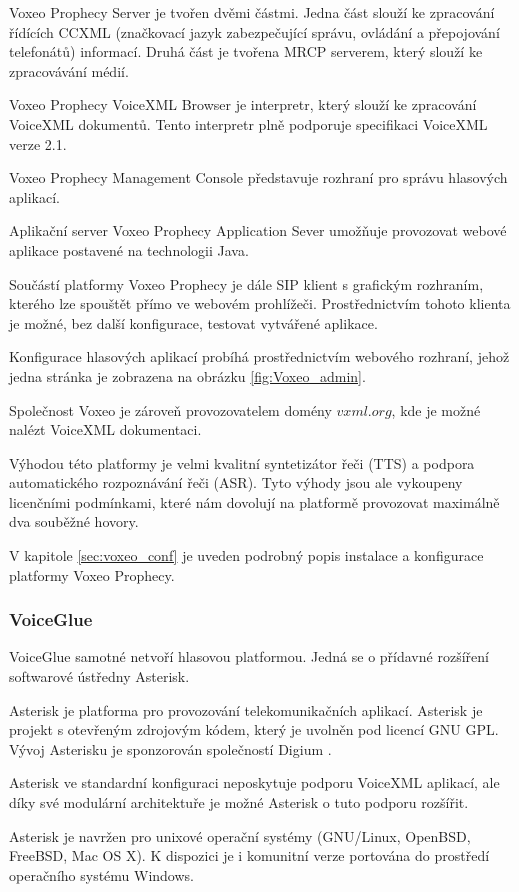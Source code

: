 \documentclass[ing,male,java,dept460]{diploma}						%
\begin{document}
Voxeo Prophecy Server je tvořen dvěmi částmi. Jedna část slouží ke zpracování řídících CCXML (značkovací jazyk zabezpečující správu, ovládání a přepojování telefonátů) informací. Druhá část je tvořena MRCP serverem, který slouží ke zpracovávání médií.

Voxeo Prophecy VoiceXML Browser je interpretr, který slouží ke zpracování VoiceXML dokumentů. Tento interpretr plně podporuje specifikaci VoiceXML verze 2.1.

Voxeo Prophecy Management Console představuje rozhraní pro správu hlasových aplikací.

Aplikační server Voxeo Prophecy Application Sever umožňuje provozovat webové aplikace postavené na technologii Java.

Součástí platformy Voxeo Prophecy je dále SIP klient s grafickým rozhraním, kterého lze spouštět přímo ve webovém prohlížeči. Prostřednictvím tohoto klienta je možné, bez další konfigurace, testovat vytvářené aplikace.

Konfigurace hlasových aplikací probíhá prostřednictvím webového rozhraní, jehož jedna stránka je zobrazena na obrázku \ref{fig:Voxeo_admin}.

Společnost Voxeo je zároveň provozovatelem domény $vxml.org$, kde je možné nalézt VoiceXML dokumentaci.

Výhodou této platformy je velmi kvalitní syntetizátor řeči (TTS) a podpora automatického rozpoznávání řeči (ASR). Tyto výhody jsou ale vykoupeny licenčními podmínkami, které nám dovolují na platformě provozovat maximálně dva souběžné hovory.

V kapitole \ref{sec:voxeo_conf} je uveden podrobný popis instalace a konfigurace platformy Voxeo Prophecy.

\subsubsection{VoiceGlue}
VoiceGlue samotné netvoří hlasovou platformou. Jedná se o přídavné rozšíření softwarové ústředny Asterisk.

Asterisk je platforma pro provozování telekomunikačních aplikací. Asterisk je projekt s otevřeným zdrojovým kódem, který je uvolněn pod licencí GNU GPL. Vývoj Asterisku je sponzorován společností Digium \cite{asterisk_org}.

Asterisk ve standardní konfiguraci neposkytuje podporu VoiceXML aplikací, ale díky své modulární architektuře je možné Asterisk o tuto podporu rozšířit.

Asterisk je navržen pro unixové operační systémy (GNU/Linux, OpenBSD, FreeBSD, Mac OS X). K dispozici je i komunitní verze portována do prostředí operačního systému Windows.
\end{document}
